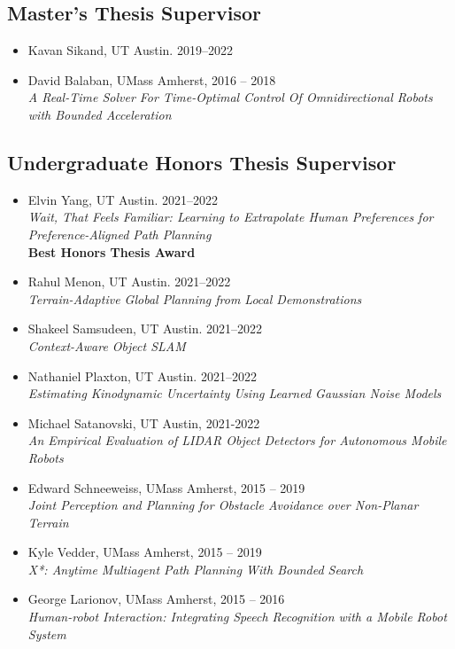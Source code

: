 \documentclass[Times]{article}
\begin{document}
\subsection*{Master's Thesis Supervisor}
\begin{itemize}
 \item Kavan Sikand, UT Austin. 2019--2022
 \item David Balaban, UMass Amherst, 2016 -- 2018\\
 \emph{A Real-Time Solver For Time-Optimal Control Of Omnidirectional Robots with Bounded Acceleration}
\end{itemize}

\subsection*{Undergraduate Honors Thesis Supervisor}
\begin{itemize}
 \item Elvin Yang, UT Austin. 2021--2022\\
 \emph{Wait, That Feels Familiar: Learning to Extrapolate Human Preferences for Preference-Aligned Path Planning}\\
 \textbf{Best Honors Thesis Award}
 \item Rahul Menon, UT Austin. 2021--2022\\
 \emph{Terrain-Adaptive Global Planning from Local Demonstrations}
 \item Shakeel Samsudeen, UT Austin. 2021--2022\\
 \emph{Context-Aware Object SLAM}
 \item Nathaniel Plaxton, UT Austin. 2021--2022\\
 \emph{Estimating Kinodynamic Uncertainty Using Learned Gaussian Noise Models}
 \item Michael Satanovski, UT Austin, 2021-2022\\
 \emph{An Empirical Evaluation of LIDAR Object Detectors for Autonomous Mobile Robots}
 \item Edward Schneeweiss, UMass Amherst, 2015 -- 2019\\
  \emph{Joint Perception and Planning for Obstacle Avoidance over Non-Planar Terrain}
 \item Kyle Vedder, UMass Amherst, 2015 -- 2019\\
  \emph{X*: Anytime Multiagent Path Planning With Bounded Search}
 \item George Larionov, UMass Amherst, 2015 -- 2016\\
  \emph{Human-robot Interaction: Integrating Speech Recognition with a Mobile Robot System}
\end{itemize}
\end{document}
